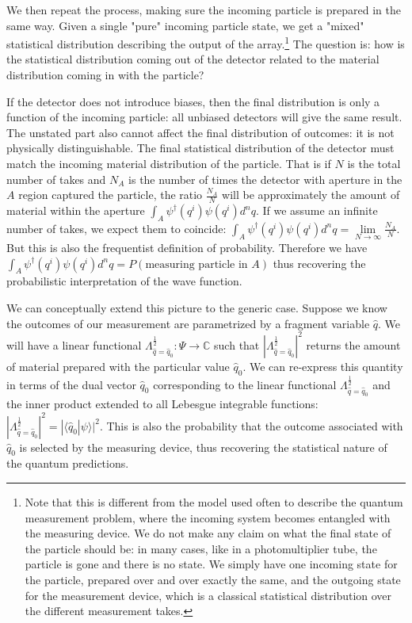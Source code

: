 \documentclass[smallextended]{svjour3}
\numberwithin{equation}{section}
\begin{document}
We then repeat the process, making sure the incoming particle is prepared in the same way. Given a single "pure" incoming particle state, we get a "mixed" statistical distribution describing the output of the array.\footnote{Note that this is different from the model used often to describe the quantum measurement problem, where the incoming system becomes entangled with the measuring device. We do not make any claim on what the final state of the particle should be: in many cases, like in a photomultiplier tube, the particle is gone and there is no state. We simply have one incoming state for the particle, prepared over and over exactly the same, and the outgoing state for the measurement device, which is a classical statistical distribution over the different measurement takes.} The question is: how is the statistical distribution coming out of the detector related to the material distribution coming in with the particle?

If the detector does not introduce biases, then the final distribution is only a function of the incoming particle: all unbiased detectors will give the same result. The unstated part also cannot affect the final distribution of outcomes: it is not physically distinguishable. The final statistical distribution of the detector must match the incoming material distribution of the particle. That is if $N$ is the total number of takes and $N_A$ is the number of times the detector with aperture in the $A$ region captured the particle, the ratio $\frac{N_A}{N}$ will be approximately the amount of material within the aperture $\int_A \psi^\dagger(q^i) \psi(q^i) d^nq$. If we assume an infinite number of takes, we expect them to coincide: $\int_A \psi^\dagger(q^i) \psi(q^i) d^nq = \lim\limits_{N\rightarrow\infty} \frac{N_A}{N}$. But this is also the frequentist definition of probability. Therefore we have $\int_A \psi^\dagger(q^i) \psi(q^i) d^nq = P(\textrm{measuring particle in } A)$ thus recovering the probabilistic interpretation of the wave function.

We can conceptually extend this picture to the generic case. Suppose we know the outcomes of our measurement are parametrized by a fragment variable $\hat{q}$. We will have a linear functional $\Lambda^{\frac{1}{2}}_{\hat{q}=\hat{q}_0} : \Psi \rightarrow \mathbb{C}$ such that $|\Lambda^{\frac{1}{2}}_{\hat{q}=\hat{q}_0}|^2$ returns the amount of material prepared with the particular value $\hat{q}_0$. We can re-express this quantity in terms of the dual vector $\hat{q}_0$ corresponding to the linear functional $\Lambda^{\frac{1}{2}}_{\hat{q}=\hat{q}_0}$ and the inner product extended to all Lebesgue integrable functions: $|\Lambda^{\frac{1}{2}}_{\hat{q}=\hat{q}_0}|^2 = |\langle \hat{q}_0 | \psi \rangle|^2 $. This is also the probability that the outcome associated with $\hat{q}_0$ is selected by the measuring device, thus recovering the statistical nature of the quantum predictions. 
\end{document}
